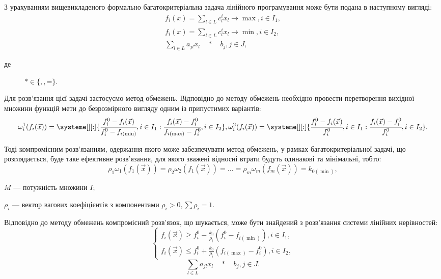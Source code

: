 З урахуванням вищевикладеного формально багатокритеріальна задача лінійного програмування може бути подана в наступному вигляді:
\begin{gather*}
	f_i(x) = \sum_{l \in L}{c_l^i x_l} \to \max, i \in I_1, \\
	f_i(x) = \sum_{l \in L}{c_l^i x_l} \to \min, i \in I_2, \\
	\sum_{l \in L}{a_{jl} x_l \quad * \quad b_j}, j \in J,
\end{gather*}
\begin{description}
	\item[де] $* \in \{$\leq$, $\geq$, $=$\}$.
\end{description}

Для розв'язання цієї задачі застосуємо метод обмежень. 
Відповідно до методу обмежень необхідно провести перетворення вихідної множини функцій мети до безрозмірного вигляду одним із припустимих варіантів:
\begin{equation}\label{eq:omega}
\omega^1_i(f_i(\vec{x})) = \systeme[][:]{
\cfrac{f_i^0-f_i(\vec{x})}{f_i^0 - f_{i(\min)}},i \in I_1
:
\cfrac{f_i(\vec{x})-f_i^0}{f_{i(\max)} - f_i^0},i \in I_2
}
, \\
\omega^2_i(f_i(\vec{x})) = \systeme[][:]{
\cfrac{f_i^0-f_i(\vec{x})}{f_i^0},i \in I_1
:
\cfrac{f_i(\vec{x})-f_i^0}{f_i^0},i \in I_2
}
.
\end{equation}

Тоді компромісним розв'язанням, одержання якого може забезпечувати метод обмежень, у рамках багатокритеріальної задачі, що розглядається, буде таке ефективне розв'язання, для якого зважені відносні втрати будуть одинакові та мінімальні, тобто:
\[
\rho_1 \omega_1 (f_1(\vec{x})) = \rho_2 \omega_2 (f_1(\vec{x})) = \ldots = \rho_m \omega_m (f_m(\vec{x})) = k_{0 (\min)},
\]
\begin{description}
	\item[де] $M$ --- потужність множини $I$; 
	\item $\rho_i$ --- вектор вагових коефіцієнтів з компонентами $\rho_i > 0, \sum{\rho_i} = 1$.
\end{description}

Відповідно до методу обмежень компромісний розв'язок, що шукається, може бути знайдений з розв'язання системи лінійних нерівностей:
\begin{equation}\label{eq:system}
	\begin{cases}
	f_i(\vec{x}) \geq f_{i}^0 - \frac{k_0}{\rho_i}(f_{i}^0 - f_{i(\min)}) , i \in I_1, \\
	f_i(\vec{x}) \leq f_{i}^0 + \frac{k_0}{\rho_i}(f_{i(\max)} - f_{i}^0 ), i \in I_2,
	\end{cases}
\end{equation}
\[
	\sum_{l \in L}{a_{jl} x_l \quad * \quad b_j}, j \in J.
\]

